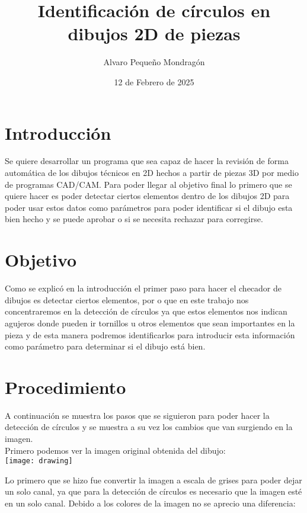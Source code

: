 \documentclass{article}
\title{\textbf{Identificación de círculos en dibujos 2D de piezas}}
\author{Alvaro Pequeño Mondragón}
\date{12 de Febrero de 2025}
\begin{document}
	
	\maketitle
	
	\section*{Introducción}
	
	Se quiere desarrollar un programa que sea capaz de hacer la revisión de forma automática de los dibujos técnicos en 2D hechos a partir de piezas 3D por medio de programas CAD/CAM. Para poder llegar al objetivo final lo primero que se quiere hacer es poder detectar ciertos elementos dentro de los dibujos 2D para poder usar estos datos como parámetros para poder identificar si el dibujo esta bien hecho y se puede aprobar o si se necesita rechazar para corregirse. \\
	
	\section*{Objetivo}
	
	Como se explicó en la introducción el primer paso para hacer el checador de dibujos es detectar ciertos elementos, por o que en este trabajo nos concentraremos en la detección de círculos ya que estos elementos nos indican agujeros donde pueden ir tornillos u otros elementos que sean importantes en la pieza y de esta manera podremos identificarlos para introducir esta información como parámetro para determinar si el dibujo está bien. \\
	
	
	\section*{Procedimiento} 
	
	A continuación se muestra los pasos que se siguieron para poder hacer la detección de círculos y se muestra a su vez los cambios que van surgiendo en la imagen. \\
	
	Primero podemos ver la imagen original obtenida del dibujo: \\
	
	\texttt{[image: drawing]}
	
	Lo primero que se hizo fue convertir la imagen a escala de grises para poder dejar un solo canal, ya que para la detección de círculos es necesario que la imagen esté en un solo canal. Debido a los colores de la imagen no se aprecio una diferencia: \\
	
\end{document}

